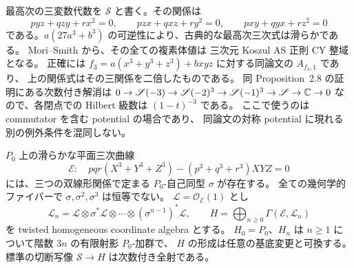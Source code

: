 最高次の三変数代数を $\mathscr S$ と書く。その関係は
\[
 p yz+q zy+r x^2=0,\qquad
 p zx+q xz+r y^2=0,\qquad
 p xy+q yx+r z^2=0
\]
である。$a(27a^3+b^3)$ の可逆性により、古典的な最高次三次式は滑らかである。
Mori--Smith \cite[Theorem~4.2(1), Proposition~2.8 and Corollary~2.9]{MS} から、その全ての複素体値は
三次元 Koszul AS 正則 CY 整域となる。
正確には $f_3=a(x^3+y^3+z^3)+bxyz$ に対する同論文の $A_{f_3,1}$ であり、
上の関係式はその三関係を二倍したものである。
同 Proposition~2.8 の証明にある次数付き解消は
$0\to\mathscr S(-3)\to\mathscr S(-2)^3\to\mathscr S(-1)^3\to\mathscr S\to\mathbb C\to0$
なので、各閉点での Hilbert 級数は $(1-t)^{-3}$ である。
ここで使うのは commutator を含む potential の場合であり、
同論文の対称 potential に現れる別の例外条件を混同しない。

\begin{lemma}[楕円境界の相対表示]\label{lem:general17-relative-elliptic-boundary}
$P_0$ 上の滑らかな平面三次曲線
\[
 \mathscr E:\quad pqr(X^3+Y^3+Z^3)-(p^3+q^3+r^3)XYZ=0
\]
には、三つの双線形関係で定まる $P_0$-自己同型 $\sigma$ が存在する。
全ての幾何学的ファイバーで $\sigma,\sigma^2,\sigma^3$ は恒等でない。
$\mathcal L=\mathcal O_{\mathscr E}(1)$ とし
\[
 \mathcal L_n=\mathcal L\otimes\sigma^*\mathcal L\otimes\cdots
       \otimes(\sigma^{n-1})^*\mathcal L,
 \qquad H=\bigoplus_{n\geq0}\Gamma(\mathscr E,\mathcal L_n)
\]
を twisted homogeneous coordinate algebra とする。
$H_0=P_0$、$H_n$ は $n\geq1$ について階数 $3n$ の有限射影 $P_0$-加群で、
$H$ の形成は任意の基底変更と可換する。
標準の切断写像 $\mathscr S\to H$ は次数付き全射である。
\end{lemma}

